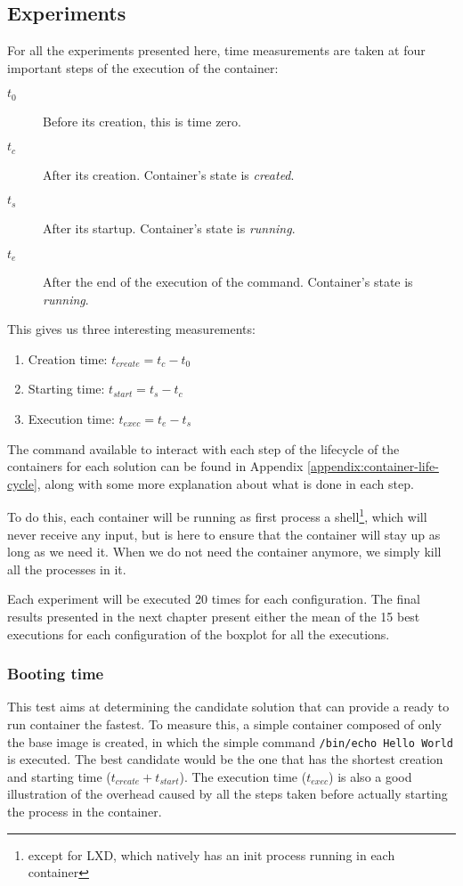 \subsection{Experiments} \label{subs:experiments}
For all the experiments presented here, time measurements are taken at four important steps of the execution of the container:
\begin{description}
  \item[$t_0$] Before its creation, this is time zero.
  \item[$t_c$] After its creation. Container's state is \textit{created}.
  \item[$t_s$] After its startup. Container's state is \textit{running}.
  \item[$t_e$] After the end of the execution of the command. Container's state is \textit{running}.
\end{description}
This gives us three interesting measurements:
\begin{enumerate}
  \item Creation time: $t_{create}=t_c - t_0$
  \item Starting time: $t_{start}=t_s - t_c$
  \item Execution time: $t_{exec}=t_e - t_s$
\end{enumerate}

The command available to interact with each step of the lifecycle of the containers for each solution can be found in Appendix \ref{appendix:container-life-cycle}, along with some more explanation about what is done in each step.

To do this, each container will be running as first process a shell\footnote{except for LXD, which natively has an init process running in each container}, which will never receive any input, but is here to ensure that the container will stay up as long as we need it.  When we do not need the container anymore, we simply kill all the processes in it.

Each experiment will be executed 20 times for each configuration.  The final results presented in the next chapter present either the mean of the 15 best executions for each configuration of the boxplot for all the executions.

\subsubsection{Booting time}
This test aims at determining the candidate solution that can provide a ready to run container the fastest.  To measure this, a simple container composed of only the base image is created, in which the simple command \texttt{/bin/echo Hello World} is executed.  The best candidate would be the one that has the shortest creation and starting time ($t_{create} + t_{start}$).  The execution time ($t_{exec}$) is also a good illustration of the overhead caused by all the steps taken before actually starting the process in the container.

